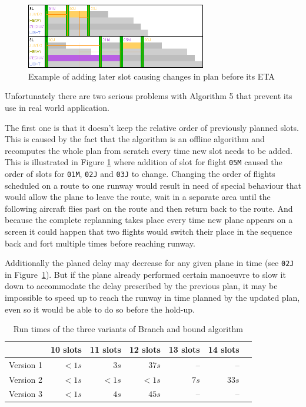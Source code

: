 \begin{figure}[h]
    \centering
    \includegraphics[width=0.7\textwidth]{figures/rwy-proof.png}
    \caption{Example of adding later slot causing changes in plan before its ETA}
    \label{fig:rwy-proof}
\end{figure}

Unfortunately there are two serious problems with Algorithm 5 that prevent its use in real world application.

The first one is that it doesn't keep the relative order of previously planned slots. This is caused by the fact that the algorithm is an offline algorithm and recomputes the whole plan from scratch every time new slot needs to be added. This is illustrated in Figure \ref{fig:rwy-proof} where addition of slot for flight \texttt{05M} caused the order of slots for \texttt{01M}, \texttt{02J} and \texttt{03J} to change. Changing the order of flights scheduled on a route to one runway would result in need of special behaviour that would allow the plane to leave the route, wait in a separate area until the following aircraft flies past on the route and then return back to the route. And because the complete replanning takes place every time new plane appears on a screen it could happen that two flights would switch their place in the sequence back and fort multiple times before reaching runway.

Additionally the planed delay may decrease for any given plane in time (see \texttt{02J} in Figure~\ref{fig:rwy-proof}). But if the plane already performed certain manoeuvre to slow it down to accommodate the delay prescribed by the previous plan, it may be impossible to speed up to reach the runway in time planned by the updated plan, even so it would be able to do so before the hold-up.

\begin{table}[h]
  \centering
\begin{tabular}{ | l || r | r | r | r | r | r | }
\hline
			& 10 slots	& 11 slots	& 12 slots	& 13 slots	& 14 slots	\\
\hline
Version 1	& $< 1s$	& $3s$		& $37s$		& –			& –			\\
Version 2	& $< 1s$	& $< 1s$	& $< 1s$	& $7s$		& $33s$		\\
Version 3	& $< 1s$	& $4s$		& $45s$		& –			& –			\\
\hline
\end{tabular}
  \caption{Run times of the three variants of Branch and bound algorithm}
  \label{tab:alg5-runtime}
\end{table}

